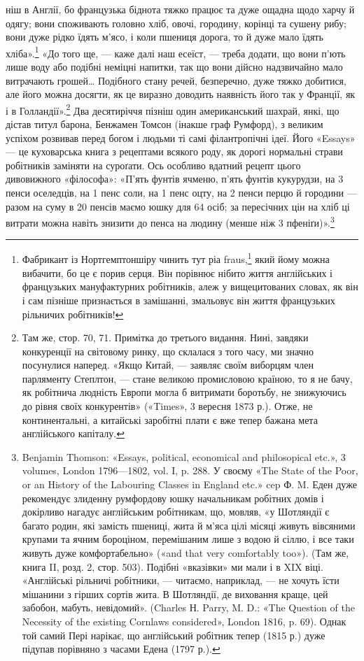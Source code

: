 \parcont{}  %
ніш в Англії, бо французька біднота тяжко працює та дуже
ощадна щодо харчу й одягу; вони споживають головно хліб,
овочі, городину, корінці та сушену рибу; вони дуже рідко їдять
м’ясо, і коли пшениця дорога, то й дуже мало їдять хліба».\footnote{
Фабрикант із Нортгемптоншіру чинить тут ріа fraus,\footnote*{
— благочестивий обман. \emph{Ред.}
} який йому
можна вибачити, бо це є порив серця. Він порівнює нібито життя англійських
і французьких мануфактурних робітників, алеж у вищецитованих
словах, як він і сам пізніше признається в замішанні, змальовує він
життя французьких рільничих робітників!
}
«До того ще, — каже далі наш есеїст, — треба додати, що вони
п’ють лише воду або подібні неміцні напитки, так що вони дійсно
надзвичайно мало витрачають грошей\dots{} Подібного стану речей,
безперечно, дуже тяжко добитися, але його можна досягти, як
це виразно доводить наявність його так у Франції, як і в Голландії».\footnote{
Там же, стор. 70, 71. Примітка до третього видання. Нині, завдяки
конкуренції на світовому ринку, що склалася з того часу, ми значно
посунулися наперед. «Якщо Китай, — заявляє своїм виборцям член парляменту
Степлтон, — стане великою промисловою країною, то я не бачу,
як робітнича людність Европи могла б витримати боротьбу, не знижуючись
до рівня своїх конкурентів» («Times», 3 вересня 1873 р.). Отже,
не континентальні, а китайські заробітні плати є вже тепер бажана
мета англійського капіталу.
} Два десятиріччя пізніш один американський шахрай,
янкі, що дістав титул барона, Бенжамен Томсон (інакше граф
Румфорд), з великим успіхом розвивав перед богом і людьми ті
самі філантропічні ідеї. Його «Essays» — це куховарська книга
з рецептами всякого роду, як дорогі нормальні страви робітників
заміняти на суроґати. Ось особливо вдатний рецепт цього
дивовижного «філософа»: «П’ять фунтів ячменю, п’ять фунтів
кукурудзи, на 3 пенси оселедців, на 1 пенс соли, на 1 пенс оцту,
на 2 пенси перцю й городини — разом на суму в 20 пенсів
маємо юшку для 64 осіб; за пересічних цін на хліб ці витрати
можна навіть знизити до  пенса на людину (менше ніж 3 пфеніґи)».\footnote{
Benjamin Thomson: «Essays, political, economical and philosopical
etc.», 3 volumes, London 1796—1802, vol. I, p. 288. У своєму «The
State of the Poor, or an History of the Labouring Classes in England etc.»
cep Ф. M. Еден дуже рекомендує злиденну румфордову юшку начальникам
робітних домів і докірливо нагадує англійським робітникам,
що, мовляв, «у Шотляндії є багато родин, які замість пшениці, жита й
м’яса цілі місяці живуть вівсяними крупами та ячним бороціном, перемішаним
лише з водою й сіллю, і все таки живуть дуже комфортабельно»
(«and that very comfortably too»). (Там же, книга II, розд. 2, стор. 503).
Подібні «вказівки» ми мали і в XIX віці. «Англійські рільничі робітники,
— читаємо, наприклад, — не хочуть їсти мішанини з гірших сортів
жита. В Шотляндії, де виховання краще, цей забобон, мабуть, невідомий».
(Charles Н. Parry, M. D.: «The Question of the Necessity of the
existing Cornlaws considered», London 1816, p. 69). Однак той самий
Пері нарікає, що англійський робітник тепер (1815 р.) дуже підупав
порівняно з часами Едена (1797 р.).
}
